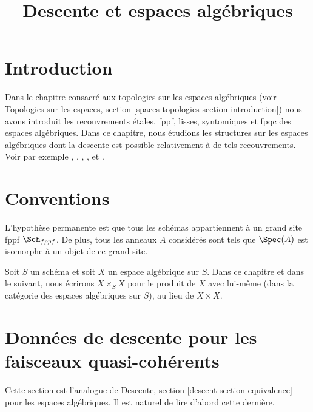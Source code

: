 

%


\title{Descente et espaces algébriques}

\maketitle

\label{section-phantom}

\tableofcontents

\section{Introduction}
\label{section-introduction}

\noindent
Dans le chapitre consacré aux topologies sur les espaces algébriques (voir
Topologies sur les espaces, section \ref{spaces-topologies-section-introduction})
nous avons introduit les recouvrements \'etales, fppf, lisses, syntomiques et fpqc des
espaces algébriques.
Dans ce chapitre, nous étudions les structures sur les espaces algébriques
dont la descente est possible relativement à de tels recouvrements.
Voir par exemple \cite{Gr-I}, \cite{Gr-II}, \cite{Gr-III},
\cite{Gr-IV}, \cite{Gr-V} et \cite{Gr-VI}.



\section{Conventions}
\label{section-conventions}

\noindent
L'hypothèse permanente est que tous les schémas appartiennent à
un grand site fppf $\Sch_{fppf}$. De plus, tous les anneaux $A$ considérés
sont tels que $\Spec(A)$ est isomorphe à un
objet de ce grand site.

\medskip\noindent
Soit $S$ un schéma et soit $X$ un espace algébrique sur $S$.
Dans ce chapitre et dans le suivant, nous écrirons $X \times_S X$
pour le produit de $X$ avec lui-même (dans la catégorie des espaces algébriques
sur $S$), au lieu de $X \times X$.






\section{Données de descente pour les faisceaux quasi-cohérents}
\label{section-equivalence}

\noindent
Cette section est l'analogue de
Descente, section \ref{descent-section-equivalence}
pour les espaces algébriques.
Il est naturel de lire d'abord cette dernière.

